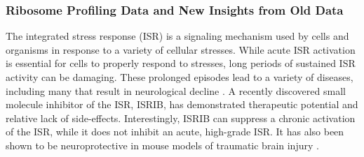 \documentclass[11pt, a4paper, oneside]{article}
\begin{document}
\subsubsection{Ribosome Profiling Data and New Insights from Old Data}
The integrated stress response (ISR) is a signaling mechanism used by cells and organisms in response to a variety of cellular stresses. While acute ISR activation is essential for cells to properly respond to stresses, long periods of sustained ISR activity can be damaging. These prolonged episodes lead to a variety of diseases, including many that result in neurological decline \cite{isr_disease}. A recently discovered small molecule inhibitor of the ISR, ISRIB, has demonstrated therapeutic potential and relative lack of side-effects. Interestingly, ISRIB can suppress a chronic activation of the ISR, while it does not inhibit an acute, high-grade ISR. It has also been shown to be neuroprotective in mouse models of traumatic brain injury \cite{isrib_activation, isrib_structure, isrib_riboseq, isrib_neuroprotective, isrib_neuroprotective2, isrib_neuroprotective3, isrib_neuroprotective4}. \par
\end{document}
